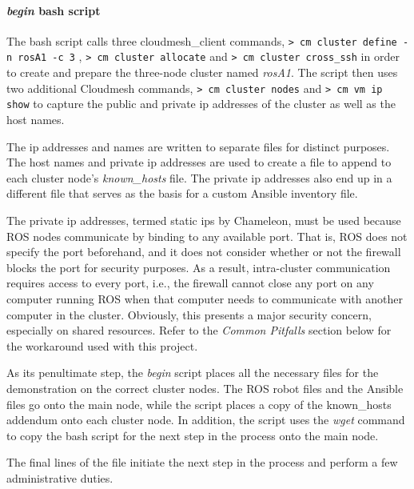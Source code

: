 \documentclass[9pt,twocolumn,twoside]{../../styles/osajnl}
\begin{document}
\paragraph{\textit{begin} bash script}
The bash script calls three cloudmesh\_client commands, {\color{green} \lstinline[style=BashInputStyle]!> cm cluster define -n rosA1 -c 3! }, {\color{green} \lstinline[style=BashInputStyle]!> cm cluster allocate! } and {\color{green} \lstinline[style=BashInputStyle]!> cm cluster cross_ssh! } in order to create and prepare the three-node cluster named \textit{rosA1}.  The script then uses two additional Cloudmesh commands, {\color{green} \lstinline[style=BashInputStyle]!> cm cluster nodes! } and {\color{green} \lstinline[style=BashInputStyle]!> cm vm ip show! } to capture the public and private ip addresses of the cluster as well as the host names.  

The ip addresses and names are written to separate files for distinct purposes.  The host names and private ip addresses are used to create a file to append to each cluster node's \textit{known\_hosts} file.  The private ip addresses also end up in a different file that serves as the basis for a custom Ansible inventory file.  

The private ip addresses, termed static ips by Chameleon, must be used because ROS nodes communicate by binding to any available port.  That is, ROS does not specify the port beforehand, and it does not consider whether or not the firewall blocks the port for security purposes.  As a result, intra-cluster communication requires access to every port, i.e., the firewall cannot close any port on any computer running ROS when that computer needs to communicate with another computer in the cluster.  Obviously, this presents a major security concern, especially on shared resources. Refer to the \textit{Common Pitfalls} section below for the workaround used with this project.

As its penultimate step, the \textit{begin} script places all the necessary files for the demonstration on the correct cluster nodes.  The ROS robot files and the Ansible files go onto the main node, while the script places a copy of the known\_hosts addendum onto each cluster node.  In addition, the script uses the \textit{wget} command to copy the bash script for the next step in the process onto the main node.

The final lines of the file initiate the next step in the process and perform a few administrative duties.
\end{document}
